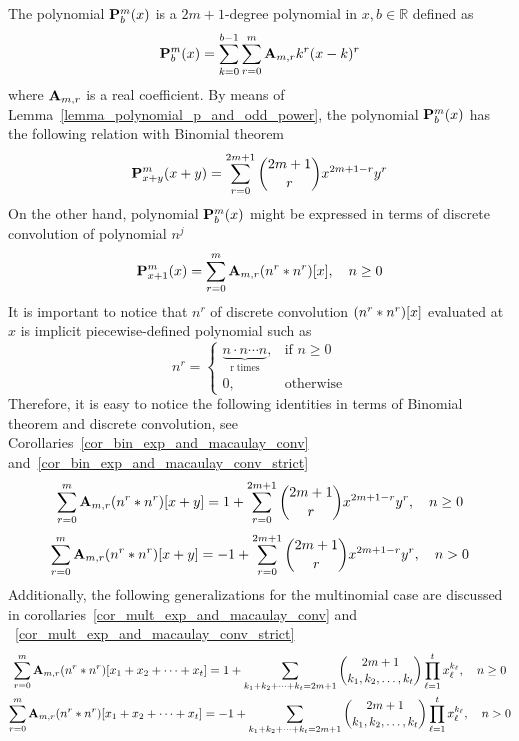 The polynomial $\polynomialP{m}{b}{x}$ is a $2m+1$-degree polynomial in $x,b\in\mathbb{R}$ defined as
\begin{align*}
    \polynomialP{m}{b}{x} = \sum_{k=0}^{b-1} \sum_{r=0}^{m} \coeffA{m}{r} k^r(x-k)^r
\end{align*}
where $\coeffA{m}{r}$ is a real coefficient.
By means of Lemma~\ref{lemma_polynomial_p_and_odd_power},
the polynomial $\polynomialP{m}{b}{x}$ has the following relation with Binomial theorem~\cite{AbraSteg72}
\begin{align*}
    \polynomialP{m}{x+y}{x+y} = \sum_{r=0}^{2m+1} \binom{2m+1}{r} x^{2m+1-r} y^r
\end{align*}
On the other hand, polynomial $\polynomialP{m}{b}{x}$ might be expressed in terms of discrete convolution
of polynomial $n^j$
\begin{align*}
    \polynomialP{m}{x+1}{x} = \sum_{r=0}^{m} \coeffA{m}{r} \convPower{n}{r}{x}, \quad n\geq 0
\end{align*}
It is important to notice that  $n^r$ of discrete convolution $\convPower{n}{r}{x}$ evaluated at $x$
is implicit piecewise-defined polynomial such as
\begin{equation*}
    n^{r} =
    \begin{cases}
        \underbrace{n \cdot n \cdots n}_{\mathrm{r \; times}}, & \mbox{if } n \geq 0 \\
        0, & \mbox{otherwise}
    \end{cases}
\end{equation*}
Therefore, it is easy to notice the following identities in terms of Binomial theorem and discrete convolution,
see Corollaries~\ref{cor_bin_exp_and_macaulay_conv} and~\ref{cor_bin_exp_and_macaulay_conv_strict}
\begin{equation*}
    \sum_{r=0}^{m} \coeffA{m}{r} \convPower{n}{r}{x+y}
    =
    1 + \sum_{r=0}^{2m+1} \binom{2m+1}{r} x^{2m+1-r} y^r, \quad n \geq 0
\end{equation*}
\begin{equation*}
    \sum_{r=0}^{m} \coeffA{m}{r} \convPower{n}{r}{x+y}
    =
    -1 + \sum_{r=0}^{2m+1} \binom{2m+1}{r} x^{2m+1-r} y^r, \quad n > 0
\end{equation*}
Additionally, the following generalizations for the multinomial case are discussed in
corollaries~\ref{cor_mult_exp_and_macaulay_conv} and ~\ref{cor_mult_exp_and_macaulay_conv_strict}
\begin{gather*}
    \sum_{r=0}^{m} \coeffA{m}{r} \convPower{n}{r}{\multifoldSum{t}} =
    1 + \sum_{\multifoldSum[k]{t}=2m+1} \binom{2m+1}{k_1, k_2,\ldots, k_t} \prod_{\ell=1}^{t} x_\ell^{k_\ell},
    \quad n \geq 0\\
    \sum_{r=0}^{m} \coeffA{m}{r} \convPower{n}{r}{\multifoldSum{t}} =
    -1 + \sum_{\multifoldSum[k]{t}=2m+1} \binom{2m+1}{k_1, k_2,\ldots, k_t} \prod_{\ell=1}^{t} x_\ell^{k_\ell},
    \quad n > 0\\
\end{gather*}

